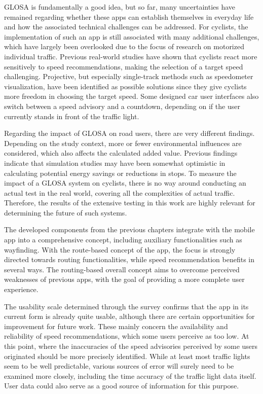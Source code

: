 GLOSA is fundamentally a good idea, but so far, many uncertainties have remained regarding whether these apps can establish themselves in everyday life and how the associated technical challenges can be addressed. For cyclists, the implementation of such an app is still associated with many additional challenges, which have largely been overlooked due to the focus of research on motorized individual traffic. Previous real-world studies have shown that cyclists react more sensitively to speed recommendations, making the selection of a target speed challenging. Projective, but especially single-track methods such as speedometer visualization, have been identified as possible solutions since they give cyclists more freedom in choosing the target speed. Some designed car user interfaces also switch between a speed advisory and a countdown, depending on if the user currently stands in front of the traffic light.

Regarding the impact of GLOSA on road users, there are very different findings. Depending on the study context, more or fewer environmental influences are considered, which also affects the calculated added value. Previous findings indicate that simulation studies may have been somewhat optimistic in calculating potential energy savings or reductions in stops. To measure the impact of a GLOSA system on cyclists, there is no way around conducting an actual test in the real world, covering all the complexities of actual traffic. Therefore, the results of the extensive testing in this work are highly relevant for determining the future of such systems.

The developed components from the previous chapters integrate with the mobile app into a comprehensive concept, including auxiliary functionalities such as wayfinding. With the route-based concept of the app, the focus is strongly directed towards routing functionalities, while speed recommendation benefits in several ways. The routing-based overall concept aims to overcome perceived weaknesses of previous apps, with the goal of providing a more complete user experience.

The usability scale determined through the survey confirms that the app in its current form is already quite usable, although there are certain opportunities for improvement for future work. These mainly concern the availability and reliability of speed recommendations, which some users perceive as too low. At this point, where the inaccuracies of the speed advisories perceived by some users originated should be more precisely identified. While at least most traffic lights seem to be well predictable, various sources of error will surely need to be examined more closely, including the time accuracy of the traffic light data itself. User data could also serve as a good source of information for this purpose.


